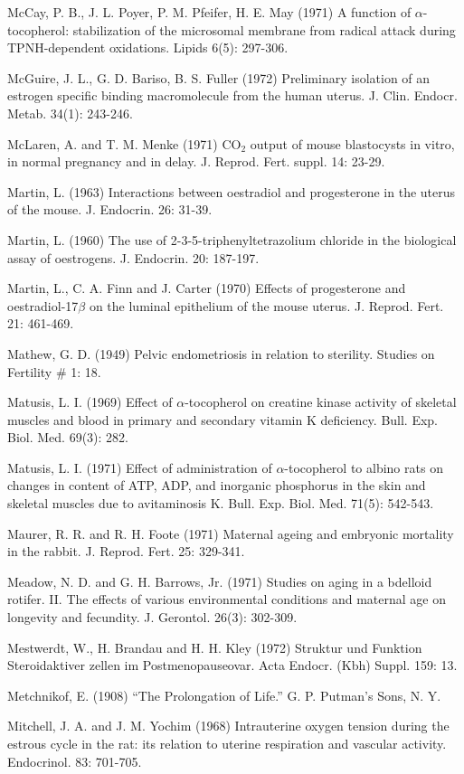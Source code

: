 McCay, P. B., J. L. Poyer, P. M. Pfeifer, H. E. May (1971) A function of $\alpha$-tocopherol: stabilization of the microsomal membrane from radical attack during TPNH-dependent oxidations. Lipids 6(5): 297-306.

McGuire, J. L., G. D. Bariso, B. S. Fuller (1972) Preliminary isolation of an estrogen specific binding macromolecule from the human uterus. J. Clin. Endocr. Metab. 34(1): 243-246.

McLaren, A. and T. M. Menke (1971) CO$_2$ output of mouse blastocysts in vitro, in normal pregnancy and in delay. J. Reprod. Fert. suppl. 14: 23-29.

Martin, L. (1963) Interactions between oestradiol and progesterone in the uterus of the mouse. J. Endocrin. 26: 31-39.

Martin, L. (1960) The use of 2-3-5-triphenyltetrazolium chloride in the biological assay of oestrogens. J. Endocrin. 20: 187-197.

Martin, L., C. A. Finn and J. Carter (1970) Effects of progesterone and oestradiol-17$\beta$ on the luminal epithelium of the mouse uterus. J. Reprod. Fert. 21: 461-469.

Mathew, G. D. (1949) Pelvic endometriosis in relation to sterility. Studies on Fertility \# 1: 18.

Matusis, L. I. (1969) Effect of $\alpha$-tocopherol on creatine kinase activity of skeletal muscles and blood in primary and secondary vitamin K deficiency. Bull. Exp. Biol. Med. 69(3): 282.

Matusis, L. I. (1971) Effect of administration of $\alpha$-tocopherol to albino rats on changes in content of ATP, ADP, and inorganic phosphorus in the skin and skeletal muscles due to avitaminosis K. Bull. Exp. Biol. Med. 71(5): 542-543.

Maurer, R. R. and R. H. Foote (1971) Maternal ageing and embryonic mortality in the rabbit. J. Reprod. Fert. 25: 329-341.

Meadow, N. D. and G. H. Barrows, Jr. (1971) Studies on aging in a bdelloid rotifer. II. The effects of various environmental conditions and maternal age on longevity and fecundity. J. Gerontol. 26(3): 302-309.

Mestwerdt, W., H. Brandau and H. H. Kley (1972) Struktur und Funktion Steroidaktiver zellen im Postmenopauseovar. Acta Endocr. (Kbh) Suppl. 159: 13.

Metchnikof, E. (1908) ``The Prolongation of Life.'' G. P. Putman's Sons, N. Y.

Mitchell, J. A. and J. M. Yochim (1968) Intrauterine oxygen tension during the estrous cycle in the rat: its relation to uterine respiration and vascular activity. Endocrinol. 83: 701-705.


